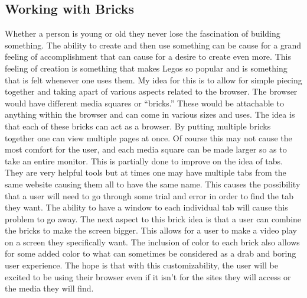 \documentclass[11pt]{article}
\begin{document}
\subsection{Working with Bricks}
Whether a person is young or old they never lose the fascination of building something. The ability to create and then use something can be cause for a grand feeling of accomplishment that can cause for a desire to create even more. This feeling of creation is something that makes Legos so popular and is something that is felt whenever one uses them. My idea for this is to allow for simple piecing together and taking apart of various aspects related to the browser. The browser would have different media squares or “bricks.” These would be attachable to anything within the browser and can come in various sizes and uses. The idea is that each of these bricks can act as a browser. By putting multiple bricks together one can view multiple pages at once. Of course this may not cause the most comfort for the user, and each media square can be made larger so as to take an entire monitor. This is partially done to improve on the idea of tabs. They are very helpful tools but at times one may have multiple tabs from the same website causing them all to have the same name. This causes the possibility that a user will need to go through some trial and error in order to find the tab they want. The ability to have a window to each individual tab will cause this problem to go away. The next aspect to this brick idea is that a user can combine the bricks to make the screen bigger. This allows for a user to make a video play on a screen they specifically want. The inclusion of color to each brick also allows for some added color to what can sometimes be considered as a drab and boring user experience. The hope is that with this customizability, the user will be excited to be using their browser even if it isn’t for the sites they will access or the media they will find.
%
\end{document}

